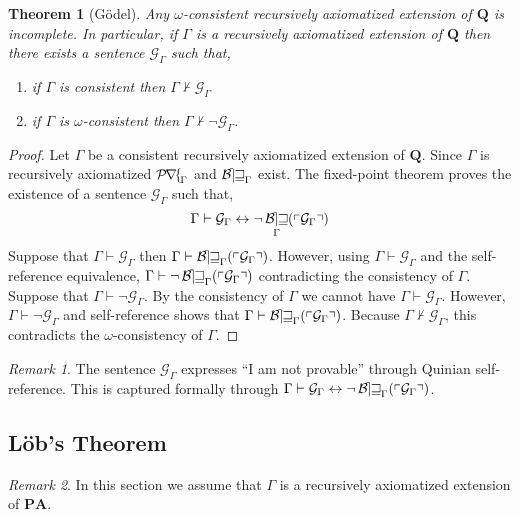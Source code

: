 \documentclass[12pt, leqno]{article}
\renewcommand{\bf}[1]{\mathbf{#1}}
\newcommand{\proves}{\vdash}
\theoremstyle{theorem}
\newtheorem{theorem}{Theorem}[section]
\theoremstyle{definition}
\theoremstyle{definition}
\theoremstyle{remark}
\theoremstyle{definition}
\theoremstyle{remark}
\newtheorem{remark}{Remark}[subsection]
\DeclareMathOperator{\Prf}{\mathcal{P\mkern-2mu r\mkern-2.5mu f\mkern-2mu}}
\DeclareMathOperator{\Bew}{\mathcal{B\mkern-2.0mu e\mkern-2.0mu w\mkern-1mu}}
\newcommand{\Gterm}[1]{\left\ulcorner #1 \right\urcorner}
\newcommand{\Thm}[1]{\Bew_{\Gamma}(\Gterm{#1})}
\newcommand{\G}[1]{\mathcal{G}_{#1}}
\begin{document}
\begin{theorem}[G\"{o}del]
Any $\omega$-consistent recursively axiomatized extension of $\bf{Q}$ is incomplete. In particular, if $\Gamma$ is a recursively axiomatized extension of $\bf{Q}$ then there exists a sentence $\G{\Gamma}$ such that,
\begin{enumerate}
\item if $\Gamma$ is consistent then $\Gamma \not\proves \G{\Gamma}$
\item if $\Gamma$ is $\omega$-consistent then $\Gamma \not\proves \neg \G{\Gamma}$.
\end{enumerate}
\end{theorem}

\begin{proof}
Let $\Gamma$ be a consistent recursively axiomatized extension of $\bf{Q}$. Since $\Gamma$ is recursively axiomatized $\Prf_{\Gamma}$ and $\Bew_{\Gamma}$ exist. The fixed-point theorem proves the existence of a sentence $\G{\Gamma}$ such that,
\[ \Gamma \proves \G{\Gamma} \leftrightarrow \neg \Thm{\G{\Gamma}} \]
Suppose that $\Gamma \proves \G{\Gamma}$ then $\Gamma \proves \Thm{\G{\Gamma}}$. However, using $\Gamma \proves \G{\Gamma}$ and the self-reference equivalence, $\Gamma \proves \neg \Thm{\G{\Gamma}}$ contradicting the consistency of $\Gamma$. 
\bigskip\\
Suppose that $\Gamma \proves \neg \G{\Gamma}$. By the consistency of $\Gamma$ we cannot have $\Gamma \proves \G{\Gamma}$. However, $\Gamma \proves \neg \G{\Gamma}$ and self-reference shows that $\Gamma \proves \Thm{\G{\Gamma}}$. Because $\Gamma \not\proves \G{\Gamma}$, this contradicts the $\omega$-consistency of $\Gamma$.
\end{proof}

\begin{remark}
The sentence $\G{\Gamma}$ expresses ``I am not provable'' through Quinian self-reference. This is captured formally through $\Gamma \proves \G{\Gamma} \leftrightarrow \neg \Thm{\G{\Gamma}}$.
\end{remark}


\subsection{L\"{o}b's Theorem}

\begin{remark}
In this section we assume that $\Gamma$ is a recursively axiomatized extension of $\bf{PA}$. 
\end{remark}
\end{document}
